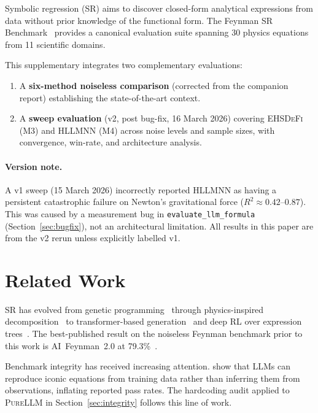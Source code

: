 \documentclass[twoside,11pt]{article}
\newcommand{\PureLLM}{\textsc{PureLLM}}
\newcommand{\EHD}{\textsc{EHSDeFi}}
\newcommand{\HSL}{\textsc{HLLMNN}}
\newcommand{\Rsq}{R^{2}}
\begin{document}
Symbolic regression (SR) aims to discover closed-form analytical expressions
from data without prior knowledge of the functional form.  The Feynman SR
Benchmark~\citep{udrescu2020ai} provides a canonical evaluation suite spanning
30 physics equations from 11 scientific domains.

This supplementary integrates two complementary evaluations:
\begin{enumerate}
  \item A \textbf{six-method noiseless comparison} (corrected from the
    companion report) establishing the state-of-the-art context.
  \item A \textbf{sweep evaluation} (v2, post bug-fix, 16 March 2026)
    covering \EHD{} (M3) and \HSL{} (M4) across noise levels and sample
    sizes, with convergence, win-rate, and architecture analysis.
\end{enumerate}

\paragraph{Version note.}
A v1 sweep (15 March 2026) incorrectly reported \HSL{} as having a persistent
catastrophic failure on Newton's gravitational force ($\Rsq \approx 0.42$--$0.87$).
This was caused by a measurement bug in \texttt{evaluate\_llm\_formula}
(Section~\ref{sec:bugfix}), not an architectural limitation.  All results in
this paper are from the v2 rerun unless explicitly labelled v1.

\section{Related Work}
\label{suppb:related}

SR has evolved from genetic programming~\citep{schmidt2009distilling} through
physics-inspired decomposition~\citep{udrescu2020ai} to transformer-based
generation~\citep{biggio2021neural,shojaee2023transformer} and deep RL over
expression trees~\citep{petersen2021deep}.  The best-published result on the
noiseless Feynman benchmark prior to this work is AI~Feynman~2.0 at
79.3\%~\citep{udrescu2020aifeynman2}.

Benchmark integrity has received increasing attention.
\citet{memorization2024audit} show that LLMs can reproduce iconic equations
from training data rather than inferring them from observations, inflating
reported pass rates.  The hardcoding audit applied to \PureLLM{} in
Section~\ref{sec:integrity} follows this line of work.
\end{document}
